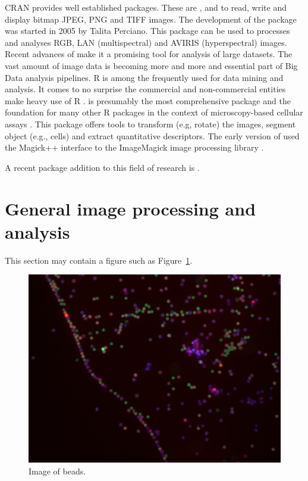 CRAN provides well established packages. These are ,  
and  to read, write and display bitmap JPEG, PNG and TIFF images. 
The development of the  \citep{frery_introduction_2013, perciano_ripa:_2014} package was 
started in 2005 by Talita Perciano. This package can be used to processes and 
analyses RGB, LAN (multispectral) and AVIRIS (hyperspectral) images. Recent 
advances of  make it a promising tool for analysis of large 
datasets. The vast amount of image data is becoming more and more and essential 
part of Big Data analysis pipelines. R is among the frequently used for data 
mining and analysis. It comes to no surprise the commercial and non-commercial 
entities make heavy use of R \citep{chen_big_2014}.  
\citep{pau_ebimager_2010} is presumably the most comprehensive package and the 
foundation for many other R packages in the context of microscopy-based cellular 
assays \citep{gowen_near_2015}. This package offers tools to transform (e.g, 
rotate) the images, segment object (e.g., cells) and extract quantitative 
descriptors. The early version of  used the Magick++ interface 
to the ImageMagick image processing library \citep{sklyar_image_2006}.

A recent package addition to this field of research is  \citep{barthelme_imager:_2016}.

 \citep{nychka_fields:_2016}

\section{General image processing and analysis}

This section may contain a figure such as Figure~\ref{figure:bead}.

\begin{figure}[htbp]
  \centering
  \includegraphics[clip=true,trim=0.1cm 0.3cm 0.2cm 0.1cm, width=12cm]{bead}
  \caption{Image of beads.}
  \label{figure:bead}
\end{figure}


